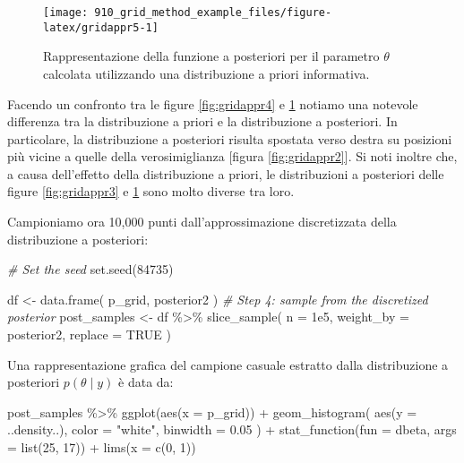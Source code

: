 \documentclass[
]{memoir}
\newenvironment{Shaded}{\begin{snugshade}}{\end{snugshade}}
\newcommand{\AttributeTok}[1]{\textcolor[rgb]{0.77,0.63,0.00}{#1}}
\newcommand{\CommentTok}[1]{\textcolor[rgb]{0.56,0.35,0.01}{\textit{#1}}}
\newcommand{\ConstantTok}[1]{\textcolor[rgb]{0.00,0.00,0.00}{#1}}
\newcommand{\DecValTok}[1]{\textcolor[rgb]{0.00,0.00,0.81}{#1}}
\newcommand{\FloatTok}[1]{\textcolor[rgb]{0.00,0.00,0.81}{#1}}
\newcommand{\FunctionTok}[1]{\textcolor[rgb]{0.00,0.00,0.00}{#1}}
\newcommand{\NormalTok}[1]{#1}
\newcommand{\OtherTok}[1]{\textcolor[rgb]{0.56,0.35,0.01}{#1}}
\newcommand{\SpecialCharTok}[1]{\textcolor[rgb]{0.00,0.00,0.00}{#1}}
\newcommand{\StringTok}[1]{\textcolor[rgb]{0.31,0.60,0.02}{#1}}
\begin{document}
\begin{figure}

{\centering \texttt{[image: 910\_grid\_method\_example\_files/figure-latex/gridappr5-1]} 

}

\caption{Rappresentazione della funzione a posteriori per il parametro $\theta$ calcolata utilizzando una distribuzione a priori informativa.}\label{fig:gridappr5}
\end{figure}

Facendo un confronto tra le figure \ref{fig:gridappr4} e \ref{fig:gridappr5} notiamo una notevole differenza tra la distribuzione a priori e la distribuzione a posteriori. In particolare, la distribuzione a posteriori risulta spostata verso destra su posizioni più vicine a quelle della verosimiglianza {[}figura \ref{fig:gridappr2}{]}. Si noti inoltre che, a causa dell'effetto della distribuzione a priori, le distribuzioni a posteriori delle figure \ref{fig:gridappr3} e \ref{fig:gridappr5} sono molto diverse tra loro.

Campioniamo ora 10,000 punti dall'approssimazione discretizzata della distribuzione a posteriori:

\begin{Shaded}
\begin{Highlighting}[]
\CommentTok{\# Set the seed}
\FunctionTok{set.seed}\NormalTok{(}\DecValTok{84735}\NormalTok{)}

\NormalTok{df }\OtherTok{\textless{}{-}} \FunctionTok{data.frame}\NormalTok{(}
\NormalTok{  p\_grid,}
\NormalTok{  posterior2}
\NormalTok{)}
\CommentTok{\# Step 4: sample from the discretized posterior}
\NormalTok{post\_samples }\OtherTok{\textless{}{-}}\NormalTok{ df }\SpecialCharTok{\%\textgreater{}\%}
  \FunctionTok{slice\_sample}\NormalTok{(}
  \AttributeTok{n =} \FloatTok{1e5}\NormalTok{,}
  \AttributeTok{weight\_by =}\NormalTok{ posterior2,}
  \AttributeTok{replace =} \ConstantTok{TRUE}
\NormalTok{)}
\end{Highlighting}
\end{Shaded}

\noindent
Una rappresentazione grafica del campione casuale estratto dalla distribuzione a posteriori \(p(\theta \mid y)\) è data da:

\begin{Shaded}
\begin{Highlighting}[]
\NormalTok{post\_samples }\SpecialCharTok{\%\textgreater{}\%}
  \FunctionTok{ggplot}\NormalTok{(}\FunctionTok{aes}\NormalTok{(}\AttributeTok{x =}\NormalTok{ p\_grid)) }\SpecialCharTok{+}
  \FunctionTok{geom\_histogram}\NormalTok{(}
    \FunctionTok{aes}\NormalTok{(}\AttributeTok{y =}\NormalTok{ ..density..), }
    \AttributeTok{color =} \StringTok{"white"}\NormalTok{, }
    \AttributeTok{binwidth =} \FloatTok{0.05}
\NormalTok{  ) }\SpecialCharTok{+}
  \FunctionTok{stat\_function}\NormalTok{(}\AttributeTok{fun =}\NormalTok{ dbeta, }\AttributeTok{args =} \FunctionTok{list}\NormalTok{(}\DecValTok{25}\NormalTok{, }\DecValTok{17}\NormalTok{)) }\SpecialCharTok{+}
  \FunctionTok{lims}\NormalTok{(}\AttributeTok{x =} \FunctionTok{c}\NormalTok{(}\DecValTok{0}\NormalTok{, }\DecValTok{1}\NormalTok{))}
\end{Highlighting}
\end{Shaded}
\end{document}
